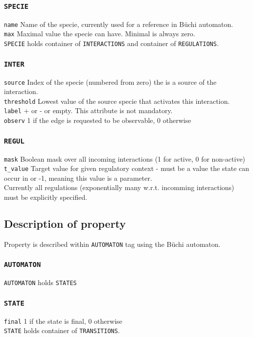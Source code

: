 \documentclass[12pt]{article}
\begin{document}
\subsubsection {\texttt{SPECIE}}
\texttt{name} Name of the specie, currently used for a reference in B\"{u}chi automaton. \\
\texttt{max} Maximal value the specie can have. Minimal is always zero.\\
\texttt{SPECIE} holds container of \texttt{INTERACTIONS} and container of \texttt{REGULATIONS}. 

\subsubsection {\texttt{INTER}}
\texttt{source} Index of the specie (numbered from zero) the is a source of the interaction. \\
\texttt{threshold} Lowest value of the source specie that activates this interaction. \\
\texttt{label} + or - or empty. This attribute is not mandatory. \\
\texttt{observ} 1 if the edge is requested to be observable, 0 otherwise

\subsubsection {\texttt{REGUL}}
\texttt{mask} Boolean mask over all incoming interactions (1 for active, 0 for non-active) \\
\texttt{t\_value} Target value for given regulatory context - must be a value the state can occur in or -1, meaning this value is a parameter. \\
Currently all regulations (exponentially many w.r.t. incomming interactions) must be explicitly specified.

\subsection{Description of property}
Property is described within \texttt{AUTOMATON} tag using the B\"{u}chi automaton.

\subsubsection {\texttt{AUTOMATON} }
\texttt{AUTOMATON} holds \texttt{STATES}

\subsubsection {\texttt{STATE}}
\texttt{final} 1 if the state is final, 0 otherwise\\
\texttt{STATE} holds container of \texttt{TRANSITIONS}.
\end{document}
